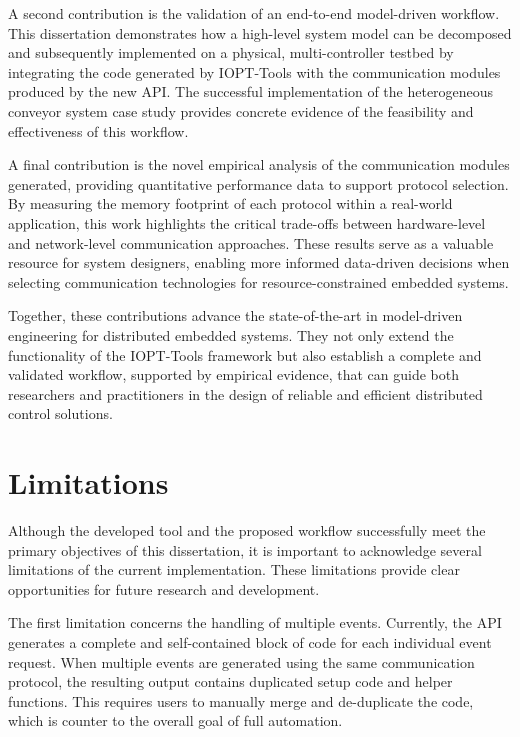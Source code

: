 A second contribution is the validation of an end-to-end model-driven workflow. This dissertation demonstrates how a high-level system model can be decomposed and subsequently implemented on a physical, multi-controller testbed by integrating the code generated by IOPT-Tools with the communication modules produced by the new API. The successful implementation of the heterogeneous conveyor system case study provides concrete evidence of the feasibility and effectiveness of this workflow.

A final contribution is the novel empirical analysis of the communication modules generated, providing quantitative performance data to support protocol selection. By measuring the memory footprint of each protocol within a real-world application, this work highlights the critical trade-offs between hardware-level and network-level communication approaches. These results serve as a valuable resource for system designers, enabling more informed data-driven decisions when selecting communication technologies for resource-constrained embedded systems.

Together, these contributions advance the state-of-the-art in model-driven engineering for distributed embedded systems. They not only extend the functionality of the IOPT-Tools framework but also establish a complete and validated workflow, supported by empirical evidence, that can guide both researchers and practitioners in the design of reliable and efficient distributed control solutions.


\section{Limitations}
\label{sec:limitations}

Although the developed tool and the proposed workflow successfully meet the primary objectives of this dissertation, it is important to acknowledge several limitations of the current implementation. These limitations provide clear opportunities for future research and development. 

The first limitation concerns the handling of multiple events. Currently, the API generates a complete and self-contained block of code for each individual event request. When multiple events are generated using the same communication protocol, the resulting output contains duplicated setup code and helper functions. This requires users to manually merge and de-duplicate the code, which is counter to the overall goal of full automation.


